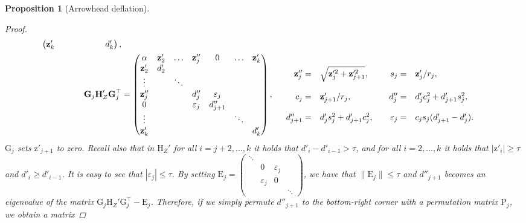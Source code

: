 \documentclass{article}
\newtheorem{proposition}{Proposition}[section]
\newcommand\vecz{\boldsymbol{\mathrm{z}}}
\newcommand\matE{\boldsymbol{\mathrm{E}}}
\newcommand\matG{\boldsymbol{\mathrm{G}}}
\newcommand\matH{\boldsymbol{\mathrm{H}}}
\newcommand\matP{\boldsymbol{\mathrm{P}}}
\begin{document}
\begin{proposition}[Arrowhead deflation]
\begin{proof}
\begin{align*}
\begin{pmatrix}
                \vecz'_{k} &  &  &  && &d'_{k}
            \end{pmatrix},
            \\
            \matG_j\matH_Z'\matG_j^\top &= \begin{pmatrix}
                \alpha & \vecz'_2 & \ldots & \vecz''_j & 0 & \ldots & \vecz'_k\\
                \vecz'_2 & d'_2 &  &  &  & &\\
                \vdots &  & \ddots &  &  & &\\
                \vecz''_j &  &  & d''_j & \varepsilon_j & &\\
                0 &  &  & \varepsilon_j &d''_{j+1} & & \\
                \vdots &  &  &  && \ddots  &\\
                \vecz'_{k} &  &  &  && &d'_{k}
            \end{pmatrix},
            \quad
            \begin{array}{r l c r l}
                \vecz''_j=&\sqrt{\vecz'^2_j+\vecz'^2_{j+1}},
                & &
                s_j=&\vecz'_{j}/r_j,
                \\\\
                c_j=&\vecz'_{j+1}/r_j,
                & &
                d''_j=&d'_jc_j^2+d'_{j+1}s_j^2,
                \\\\
                d''_{j+1}=&d'_js_j^2+d'_{j+1}c_j^2,
                & &
                \varepsilon_j=&c_js_j(d'_{j+1}-d'_j).
            \end{array}
        \end{align*}
        $\matG_j$ sets $\vecz'_{j+1}$ to zero.
        Recall also that in $\matH_Z'$ for all $i=j+2,\ldots, k$ it holds that $d'_{i}-d'_{i-1}>\tau$, and for all $i=2,\dots,k$ it holds that $|\vecz'_i|\geq \tau$ and $d'_{i}\geq d'_{i-1}$.
        It is easy to see that $|\varepsilon_j|\leq \tau$. By setting $\matE_j=\begin{pmatrix}
            \ddots & & & \\
              & 0 & \varepsilon_j & \\
              &  \varepsilon_j & 0& \\
              & & & \ddots
        \end{pmatrix}$,
        we have that $\|\matE_j\|\leq \tau$ and $d''_{j+1}$ becomes an eigenvalue of the matrix $\matG_j\matH_Z'\matG_j^\top - \matE_j$. 
        Therefore, if we simply permute $d''_{j+1}$ to the bottom-right corner with a permutation matrix $\matP_j$, we obtain a matrix

\end{proof}
\end{proposition}
\end{document}
